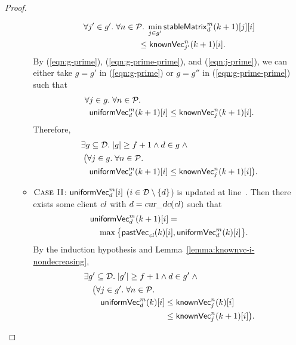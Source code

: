 \begin{proof}
\begin{itemize}
\begin{itemize}
\begin{align}
            &\forall j' \in g'.\; \forall n \in \mathcal{P}.\;
              \min_{j \in g'} {\sf stableMatrix}^{m}_{d}(k+1)[j][i]
              \nonumber\\
              &\qquad\qquad\qquad\;\; \le {\sf knownVec}^{n}_{j'}(k+1)[i]. \label{eqn:j-prime}
          \end{align}
          By (\ref{eqn:g-prime}), (\ref{eqn:g-prime-prime}),
          and (\ref{eqn:j-prime}),
          we can either take $g = g'$ in (\ref{eqn:g-prime})
          or $g = g''$ in (\ref{eqn:g-prime-prime}) such that
          \begin{align*}
            &\forall j \in g.\; \forall n \in \mathcal{P}. \\
              &\;\; {\sf uniformVec}^{m}_{d}(k+1)[i] \le {\sf knownVec}^{n}_{j}(k+1)[i].
          \end{align*}
          Therefore,
          \begin{align*}
            &\exists g \subseteq \mathcal{D}.\; |g| \ge f + 1 \land d \in g\; \land \\
              &\; \big(\forall j \in g.\; \forall n \in \mathcal{P}.\; \\
                &\quad {\sf uniformVec}^{m}_{d}(k+1)[i] \le {\sf knownVec}^{n}_{j}(k+1)[i] \big).
          \end{align*}
        \item $\textsc{Case II}$: ${\sf uniformVec}^{m}_{d}[i]$
          ($i \in \mathcal{D} \setminus \{d\}$) is updated
          at line~\code{\ref{alg:unistore-coord}}{\ref{line:start-uniformvc}}.
          Then there exists some client $\mathit{cl}$ with $d = \textsl{cur\_dc}(\mathit{cl})$ such that
          \begin{align}
            &{\sf uniformVec}^{m}_{d}(k+1)[i] = \label{eqn:uniformvc-pastvc} \\
              &\quad \max\big\{{\sf pastVec}_{\mathit{cl}}(k)[i], {\sf uniformVec}^{m}_{d}(k)[i]\big\}.
              \nonumber
          \end{align}
          By the induction hypothesis and Lemma~\ref{lemma:knownvc-i-nondecreasing},
          \begin{align}
            &\exists g' \subseteq \D.\; |g'| \ge f + 1 \land d \in g'\; \land
              \label{eqn:g-prime-2} \\
              &\quad \big(\forall j \in g'.\; \forall n \in \P. \nonumber \\
                &\qquad \uniformVC^{m}_{d}(k)[i] \le \knownVC^{n}_{j}(k)[i] \nonumber \\
                &\phantom{\qquad \uniformVC^{m}_{d}(k)[i] }
                  \le \knownVC^{n}_{j}(k+1)[i]\big). \nonumber

\end{align}
\end{itemize}
\end{itemize}
\end{proof}

